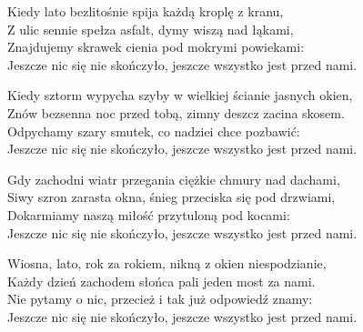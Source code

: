 \begin{text}
    Kiedy lato bezlitośnie spija każdą kroplę z kranu,\\
    Z ulic sennie spełza asfalt, dymy wiszą nad łąkami,\\
    Znajdujemy skrawek cienia pod mokrymi powiekami:\\
    Jeszcze nic się nie skończyło, jeszcze wszystko jest przed nami.

    Kiedy sztorm wypycha szyby w wielkiej ścianie jasnych okien,\\
    Znów bezsenna noc przed tobą, zimny deszcz zacina skosem.\\
    Odpychamy szary smutek, co nadziei chce pozbawić:\\
    Jeszcze nic się nie skończyło, jeszcze wszystko jest przed nami.

    Gdy zachodni wiatr przegania ciężkie chmury nad dachami,\\
    Siwy szron zarasta okna, śnieg przeciska się pod drzwiami,\\
    Dokarmiamy naszą miłość przytuloną pod kocami:\\
    Jeszcze nic się nie skończyło, jeszcze wszystko jest przed nami.

    Wiosna, lato, rok za rokiem, nikną z okien niespodzianie,\\
    Każdy dzień zachodem słońca pali jeden most za nami.\\
    Nie pytamy o nic, przecież i tak już odpowiedź znamy:\\
    Jeszcze nic się nie skończyło, jeszcze wszystko jest przed nami.
\end{text}
\begin{chord}

\end{chord}